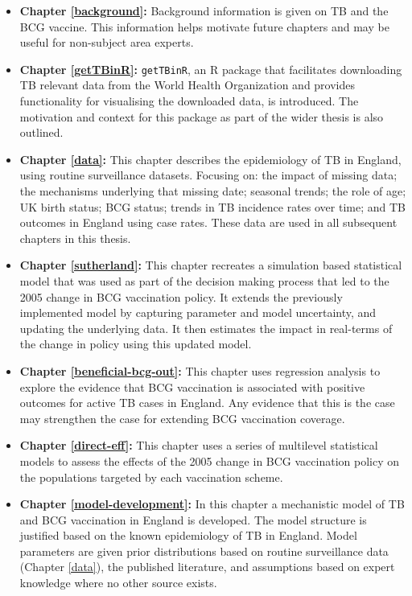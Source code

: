 \documentclass[11pt,twoside]{bristolthesis}
\begin{document}
  \begin{itemize}
  \item
    \textbf{Chapter \ref{background}:} Background information is given on TB and the BCG vaccine. This information helps motivate future chapters and may be useful for non-subject area experts.
  \item
    \textbf{Chapter \ref{getTBinR}:} \texttt{getTBinR}, an R package that facilitates downloading TB relevant data from the World Health Organization and provides functionality for visualising the downloaded data, is introduced. The motivation and context for this package as part of the wider thesis is also outlined.
  \item
    \textbf{Chapter \ref{data}:} This chapter describes the epidemiology of TB in England, using routine surveillance datasets. Focusing on: the impact of missing data; the mechanisms underlying that missing date; seasonal trends; the role of age; UK birth status; BCG status; trends in TB incidence rates over time; and TB outcomes in England using case rates. These data are used in all subsequent chapters in this thesis.
  \item
    \textbf{Chapter \ref{sutherland}:} This chapter recreates a simulation based statistical model that was used as part of the decision making process that led to the 2005 change in BCG vaccination policy. It extends the previously implemented model by capturing parameter and model uncertainty, and updating the underlying data. It then estimates the impact in real-terms of the change in policy using this updated model.
  \item
    \textbf{Chapter \ref{beneficial-bcg-out}:} This chapter uses regression analysis to explore the evidence that BCG vaccination is associated with positive outcomes for active TB cases in England. Any evidence that this is the case may strengthen the case for extending BCG vaccination coverage.
  \item
    \textbf{Chapter \ref{direct-eff}:} This chapter uses a series of multilevel statistical models to assess the effects of the 2005 change in BCG vaccination policy on the populations targeted by each vaccination scheme.
  \item
    \textbf{Chapter \ref{model-development}:} In this chapter a mechanistic model of TB and BCG vaccination in England is developed. The model structure is justified based on the known epidemiology of TB in England. Model parameters are given prior distributions based on routine surveillance data (Chapter \ref{data}), the published literature, and assumptions based on expert knowledge where no other source exists.

\end{itemize}
\end{document}

